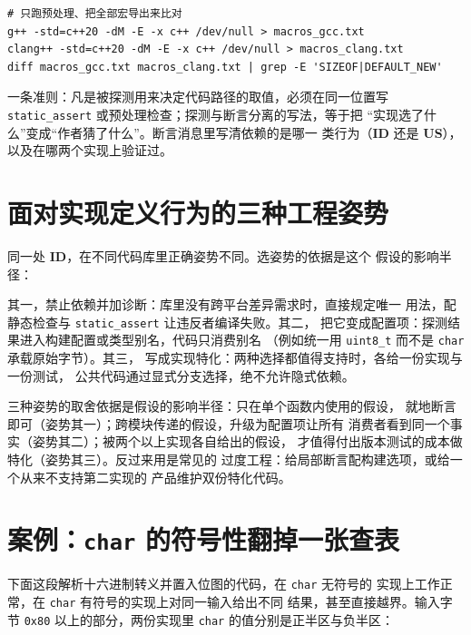 \documentclass[12pt,a4paper,fontset=fandol]{ctexbook}
\newcommand{\Tp}[1]{\texttt{#1}}
\newcommand{\Bk}{\discretionary{}{}{}}
\newcommand{\IDB}{\textbf{\textsf{ID}}}
\newcommand{\USB}{\textbf{\textsf{US}}}
\begin{document}
\begin{lstlisting}[style=shellstyle, caption={导出实现的预定义宏清单，两份实现相减即是差异面}]
# 只跑预处理、把全部宏导出来比对
g++ -std=c++20 -dM -E -x c++ /dev/null > macros_gcc.txt
clang++ -std=c++20 -dM -E -x c++ /dev/null > macros_clang.txt
diff macros_gcc.txt macros_clang.txt | grep -E 'SIZEOF|DEFAULT_NEW'
\end{lstlisting}

\begin{bestpractice}[title=探测进编译期，差异进配置，假设进断言]
一条准则：凡是被探测用来决定代码路径的取值，必须在同一位置写
\Tp{static{\Bk}\_assert} 或预处理检查；探测与断言分离的写法，等于把
“实现选了什么”变成“作者猜了什么”。断言消息里写清依赖的是哪一
类行为（\IDB{} 还是 \USB{}），以及在哪两个实现上验证过。
\end{bestpractice}

\section{面对实现定义行为的三种工程姿势}\label{sec:ub13-postures}

同一处 \IDB{}，在不同代码库里正确姿势不同。选姿势的依据是这个
假设的影响半径：

\begin{guideline}[title=禁止依赖、配置项、实现特化：按影响半径选姿势]
其一，禁止依赖并加诊断：库里没有跨平台差异需求时，直接规定唯一
用法，配静态检查与 \Tp{static\_assert} 让违反者编译失败。其二，
把它变成配置项：探测结果进入构建配置或类型别名，代码只消费别名
（例如统一用 \Tp{uint8\_t} 而不是 \Tp{char} 承载原始字节）。其三，
写成实现特化：两种选择都值得支持时，各给一份实现与一份测试，
公共代码通过显式分支选择，绝不允许隐式依赖。
\end{guideline}

三种姿势的取舍依据是假设的影响半径：只在单个函数内使用的假设，
就地断言即可（姿势其一）；跨模块传递的假设，升级为配置项让所有
消费者看到同一个事实（姿势其二）；被两个以上实现各自给出的假设，
才值得付出版本测试的成本做特化（姿势其三）。反过来用是常见的
过度工程：给局部断言配构建选项，或给一个从来不支持第二实现的
产品维护双份特化代码。

\section{案例：\Tp{char} 的符号性翻掉一张查表}\label{sec:ub13-char-case}

下面这段解析十六进制转义并置入位图的代码，在 \Tp{char} 无符号的
实现上工作正常，在 \Tp{char} 有符号的实现上对同一输入给出不同
结果，甚至直接越界。输入字节 \Tp{0x80} 以上的部分，两份实现里
\Tp{char} 的值分别是正半区与负半区：
\end{document}
